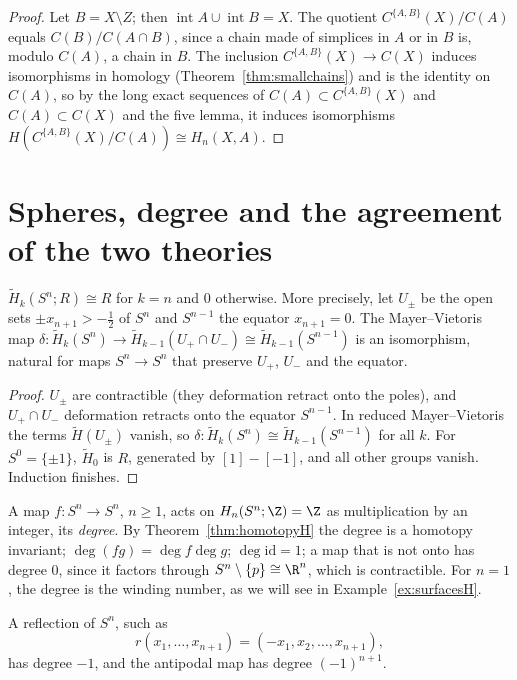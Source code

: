 \begin{proof}
Let $B=X\setminus Z$; then $\operatorname{int}A\cup\operatorname{int}B=X$. The quotient $C^{\{A,B\}}(X)/C(A)$ equals $C(B)/C(A\cap B)$, since a chain made of simplices in $A$ or in $B$ is, modulo $C(A)$, a chain in $B$.
The inclusion $C^{\{A,B\}}(X)\to C(X)$ induces isomorphisms in homology (Theorem~\ref{thm:smallchains}) and is the identity on $C(A)$, so by the long exact sequences of $C(A)\subset C^{\{A,B\}}(X)$ and
$C(A)\subset C(X)$ and the five lemma, it induces isomorphisms $H(C^{\{A,B\}}(X)/C(A))\cong H_n(X,A)$.
\end{proof}

\section{Spheres, degree and the agreement of the two theories}

\begin{theorem}\label{thm:spheres}
$\tilde H_k(S^n;R)\cong R$ for $k=n$ and $0$ otherwise. More precisely, let $U_\pm$ be the open sets $\pm x_{n+1}>-\frac12$ of $S^n$ and $S^{n-1}$ the equator $x_{n+1}=0$. The Mayer--Vietoris map
$\delta\colon\tilde H_k(S^n)\to\tilde H_{k-1}(U_+\cap U_-)\cong\tilde H_{k-1}(S^{n-1})$ is an isomorphism, natural for maps $S^n\to S^n$ that preserve $U_+$, $U_-$ and the equator.
\end{theorem}

\begin{proof}
$U_\pm$ are contractible (they deformation retract onto the poles), and $U_+\cap U_-$ deformation retracts onto the equator $S^{n-1}$. In reduced Mayer--Vietoris the terms $\tilde H(U_\pm)$ vanish, so
$\delta\colon\tilde H_k(S^n)\cong\tilde H_{k-1}(S^{n-1})$ for all $k$. For $S^0=\{\pm1\}$, $\tilde H_0$ is $R$, generated by $[1]-[-1]$, and all other groups vanish. Induction finishes.
\end{proof}

A map $f\colon S^n\to S^n$, $n\ge1$, acts on $H_n(S^n;\Z)=\Z$ as multiplication by an integer, its \emph{degree}. By Theorem~\ref{thm:homotopyH} the degree is a homotopy invariant; $\deg(fg)=\deg f\deg g$;
$\deg\mathrm{id}=1$; a map that is not onto has degree $0$, since it factors through $S^n\setminus\{p\}\cong\R^n$, which is contractible. For $n=1$, the degree is the winding number, as we will see in
Example~\ref{ex:surfacesH}.

\begin{proposition}\label{prop:reflection}
A reflection of $S^n$, such as
\[r(x_1,\dots,x_{n+1})=(-x_1,x_2,\dots,x_{n+1}),\]
has degree $-1$, and the antipodal map has degree $(-1)^{n+1}$.
\end{proposition}


